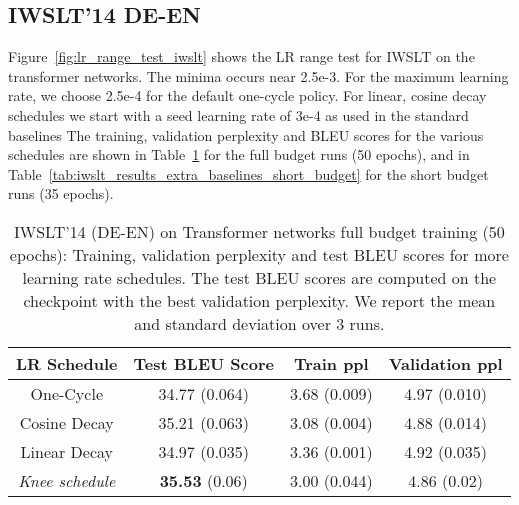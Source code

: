 \documentclass{article} \usepackage{iclr2021_conference,times}
\newcommand{\lrschedule}{\textit{Knee schedule}}
\begin{document}
\subsection{IWSLT'14 DE-EN}
Figure~\ref{fig:lr_range_test_iwslt} shows the LR range test for IWSLT on the transformer networks. The minima occurs near 2.5e-3. For the maximum learning rate, we choose 2.5e-4 for the default one-cycle policy. For linear, cosine decay schedules we start with a seed learning rate of 3e-4 as used in the standard baselines The training, validation perplexity and BLEU scores for the various schedules are shown in Table~\ref{tab:iwslt_results_extra_baselines_full_budget} for the full budget runs (50 epochs), and in Table~\ref{tab:iwslt_results_extra_baselines_short_budget} for the short budget runs (35 epochs).

\begin{table}[h]
\small
\centering
\caption{IWSLT'14 (DE-EN) on Transformer networks full budget training (50 epochs): Training, validation perplexity and test BLEU scores for more learning rate schedules. The test BLEU scores are computed on the checkpoint with the best validation perplexity. We report the mean and standard deviation over 3 runs.}
\label{tab:iwslt_results_extra_baselines_full_budget}
\begin{tabular}{cccc}
  \toprule
  LR Schedule   & Test BLEU Score  & Train ppl & Validation ppl  \\ 
  \midrule
  One-Cycle     &  34.77 (0.064) & 3.68 (0.009)  & 4.97 (0.010)   \\
  Cosine Decay  &  35.21 (0.063) & 3.08 (0.004)   & 4.88 (0.014)  \\
  Linear Decay  &  34.97 (0.035) & 3.36 (0.001)   & 4.92 (0.035)   \\
  \lrschedule{} &  \textbf{35.53} (0.06)  & 3.00 (0.044)   & 4.86 (0.02)    \\ 
  \bottomrule
\end{tabular}

\end{table}
\end{document}
